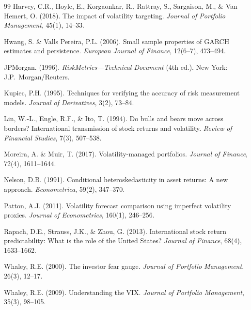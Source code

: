 \documentclass[12pt,a4paper]{article}
\begin{document}
\begin{thebibliography}{99}
Harvey, C.R., Hoyle, E., Korgaonkar, R., Rattray, S., Sargaison, M., \& Van Hemert, O. (2018). The impact of volatility targeting. \textit{Journal of Portfolio Management}, 45(1), 14--33.

Hwang, S. \& Valls Pereira, P.L. (2006). Small sample properties of GARCH estimates and persistence. \textit{European Journal of Finance}, 12(6--7), 473--494.

JPMorgan. (1996). \textit{RiskMetrics---Technical Document} (4th ed.). New York: J.P.~Morgan/Reuters.

Kupiec, P.H. (1995). Techniques for verifying the accuracy of risk measurement models. \textit{Journal of Derivatives}, 3(2), 73--84.

Lin, W.-L., Engle, R.F., \& Ito, T. (1994). Do bulls and bears move across borders? International transmission of stock returns and volatility. \textit{Review of Financial Studies}, 7(3), 507--538.

Moreira, A. \& Muir, T. (2017). Volatility-managed portfolios. \textit{Journal of Finance}, 72(4), 1611--1644.

Nelson, D.B. (1991). Conditional heteroskedasticity in asset returns: A new approach. \textit{Econometrica}, 59(2), 347--370.

Patton, A.J. (2011). Volatility forecast comparison using imperfect volatility proxies. \textit{Journal of Econometrics}, 160(1), 246--256.

Rapach, D.E., Strauss, J.K., \& Zhou, G. (2013). International stock return predictability: What is the role of the United States? \textit{Journal of Finance}, 68(4), 1633--1662.

Whaley, R.E. (2000). The investor fear gauge. \textit{Journal of Portfolio Management}, 26(3), 12--17.

Whaley, R.E. (2009). Understanding the VIX. \textit{Journal of Portfolio Management}, 35(3), 98--105.

\end{thebibliography}
\end{document}
